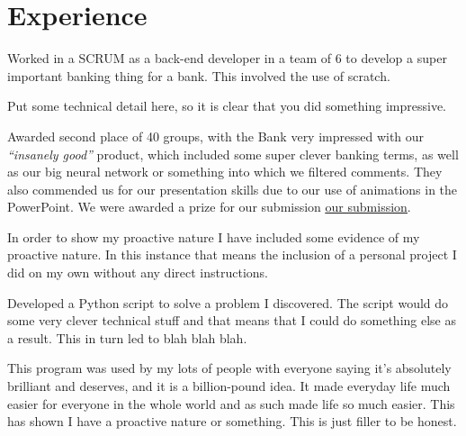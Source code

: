 \section{Experience}


        \vspace{\topsep} %
        \begin{tightitemize}
            \item Worked in a SCRUM as a back-end developer in a team of 6 to develop a super important banking thing for a bank. This involved the use of scratch.
            \item Put some technical detail here, so it is clear that you did something impressive.
            \item Awarded second place of 40 groups, with the Bank very impressed with our \textit{“insanely good”} product, which included some super clever banking terms,
            as well as our big neural network or something into which we filtered comments. They also commended us for our presentation skills due to our use of animations
            in the PowerPoint. We were awarded a prize for our submission \href{https://www.youtube.com/watch?v=dQw4w9WgXcQ}{\underline{our submission}}.
        \end{tightitemize}

    \sectionspace %

        \begin{tightitemize}
            \item In order to show my proactive nature I have included some evidence of my proactive nature. In this instance that means the inclusion of a personal project
            I did on my own without any direct instructions.
            \item Developed a Python script to solve a problem I discovered. The script would do some very clever technical stuff and that means that I could do something
            else as a result. This in turn led to blah blah blah.
            \item This program was used by my lots of people with everyone saying it's absolutely brilliant and deserves, and it is a billion-pound idea. It made everyday
            life much easier for everyone in the whole world and as such made life so much easier. This has shown I have a proactive nature or something. This is just
            filler to be honest.
        \end{tightitemize}


